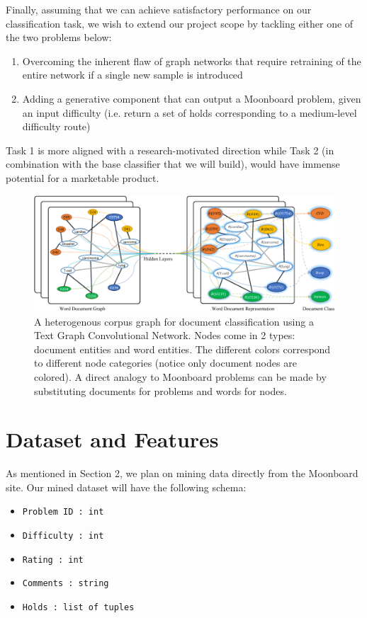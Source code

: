 \documentclass{article}
\begin{document}
Finally, assuming that we can achieve satisfactory performance on our classification task, we wish to extend our project scope by tackling either one of the two problems below:

\begin{enumerate}
\setlength\itemsep{0.1em}
\item Overcoming the inherent flaw of graph networks that require retraining of the entire network if a single new sample is introduced
\item Adding a generative component that can output a Moonboard problem, given an input difficulty (i.e. return a set of holds corresponding to a medium-level difficulty route)
\end{enumerate}

Task 1 is more aligned with a research-motivated direction while Task 2 (in combination with the base classifier that we will build), would have immense potential for a marketable product. 

\begin{figure}
\centering
\includegraphics[width=.8\linewidth]{textGCN}
\caption{A heterogenous corpus graph for document classification using a Text Graph Convolutional Network. Nodes come in 2 types: document entities and word entities. The different colors correspond to different node categories (notice only document nodes are colored). A direct analogy to Moonboard problems can be made by substituting documents for problems and words for nodes.}
\label{fig: Corpus graph for Text Graph Convolutional Network}
\end{figure}

\section{Dataset and Features}
As mentioned in Section 2, we plan on mining data directly from the Moonboard site. Our mined dataset will have the following schema:

\begin{itemize}
\setlength\itemsep{0.1em}
\item \texttt{Problem ID : int}
\item \texttt{Difficulty : int}
\item \texttt{Rating : int}
\item \texttt{Comments : string}
\item \texttt{Holds : list of tuples}
\end{itemize}
\end{document}

